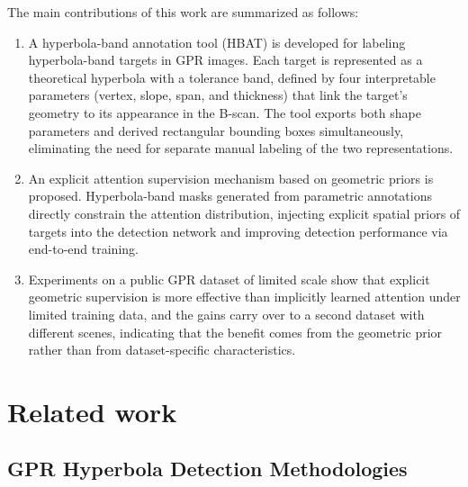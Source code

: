 \documentclass[lettersize,journal]{IEEEtran}
\begin{document}
The main contributions of this work are summarized as follows:
\begin{enumerate}

 \item A hyperbola-band annotation tool (HBAT) is developed for labeling hyperbola-band targets in GPR images. 
 Each target is represented as a theoretical hyperbola with a tolerance band, defined by four interpretable parameters (vertex, slope, span, and thickness) that link the target's geometry to its appearance in the B-scan. 
 The tool exports both shape parameters and derived rectangular bounding boxes simultaneously, eliminating the need for separate manual labeling of the two representations.

\item An explicit attention supervision mechanism based on geometric priors is proposed. 
Hyperbola-band masks generated from parametric annotations directly constrain the attention distribution, injecting explicit spatial priors of targets into the detection network and improving detection performance via end-to-end training.

\item Experiments on a public GPR dataset of limited scale show that explicit geometric supervision is more effective than implicitly learned attention under limited training data, and the gains carry over to a second dataset with different scenes, indicating that the benefit comes from the geometric prior rather than from dataset-specific characteristics.


\end{enumerate}

\section{Related work}
\subsection{GPR Hyperbola Detection Methodologies}
\end{document}
